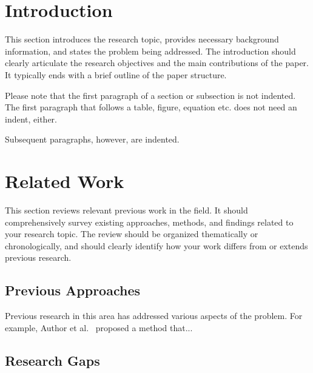 \documentclass[runningheads]{llncs}
\begin{document}
\section{Introduction}

This section introduces the research topic, provides necessary background
information, and states the problem being addressed. The introduction should
clearly articulate the research objectives and the main contributions of the
paper. It typically ends with a brief outline of the paper structure.

Please note that the first paragraph of a section or subsection is
not indented. The first paragraph that follows a table, figure,
equation etc. does not need an indent, either.

Subsequent paragraphs, however, are indented.

\section{Related Work}

This section reviews relevant previous work in the field. It should
comprehensively survey existing approaches, methods, and findings related
to your research topic. The review should be organized thematically or
chronologically, and should clearly identify how your work differs from or
extends previous research.

\subsection{Previous Approaches}

Previous research in this area has addressed various aspects of the problem.
For example, Author et al.~\cite{ref_article1} proposed a method that...

\subsection{Research Gaps}
\end{document}
